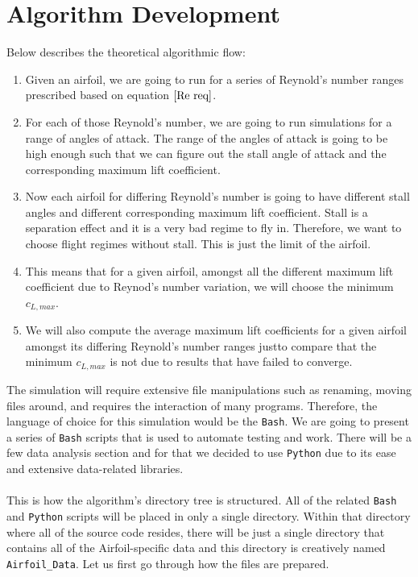 \section{Algorithm Development}

Below describes the theoretical algorithmic flow:
\begin{enumerate}
\item Given an airfoil, we are going to run for a series of Reynold's number ranges prescribed based on equation $\ref{Re req}$. 
\item For each of those Reynold's number, we are going to run simulations for a range of angles of attack. The range of the angles of attack is going to be high enough such that we can figure out the stall angle of attack and the corresponding maximum lift coefficient.
\item Now each airfoil for differing Reynold's number is going to have different stall angles and different corresponding maximum lift coefficient. Stall is a separation effect and it is a very bad regime to fly in. Therefore, we want to choose flight regimes without stall. This is just the limit of the airfoil.
\item This means that for a given airfoil, amongst all the different maximum lift coefficient due to Reynod's number variation, we will choose the minimum $c_{L,max}$.
\item We will also compute the average maximum lift coefficients for a given airfoil amongst its differing Reynold's number ranges justto compare that the minimum $c_{L,max}$ is not due to results that have failed to converge.
\end{enumerate}
The simulation will require extensive file manipulations such as renaming, moving files around, and requires the interaction of many programs. Therefore, the language of choice for this simulation would be the \texttt{Bash}. We are going to present a series of \texttt{Bash} scripts that is used to automate testing and work. There will be a few data analysis section and for that we decided to use \texttt{Python} due to its ease and extensive data-related libraries.
\\~\\This is how the algorithm's directory tree is structured. All of the related \texttt{Bash} and \texttt{Python} scripts will be placed in only a single directory. Within that directory where all of the source code resides, there will be just a single directory that contains all of the Airfoil-specific data and this directory is creatively named \texttt{Airfoil\_Data}. Let us first go through how the files are prepared.

